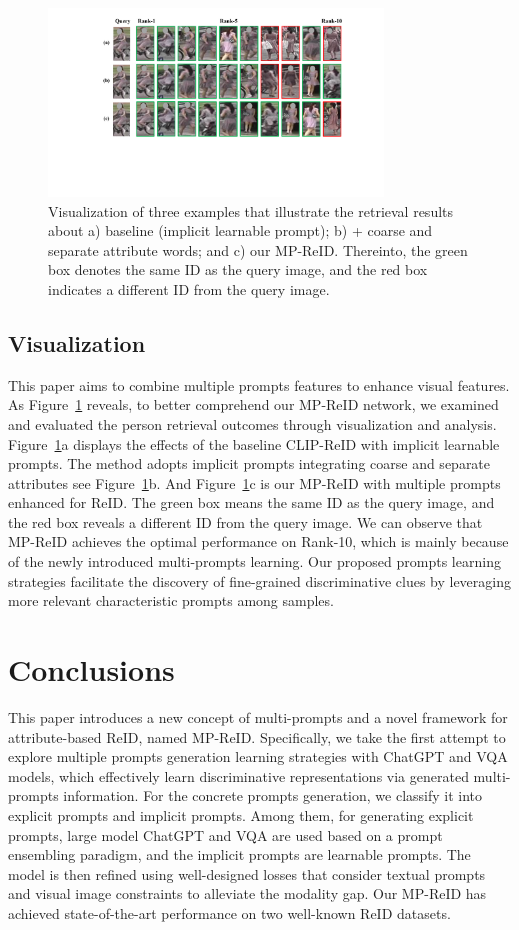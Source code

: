\documentclass[letterpaper]{article} %
\begin{document}
\begin{figure}[t!]
    \centering
    \includegraphics[width=1.0\linewidth,height=5.0cm]{results.pdf}
    \caption{Visualization of three examples that illustrate the retrieval results about a) baseline (implicit learnable prompt); b) + coarse and separate attribute words; and c) our MP-ReID. Thereinto, the green box denotes the same ID as the query image, and the red box indicates a different ID from the query image.}
    \label{visual3}
\end{figure}

\subsection{Visualization} \label{visualizations}
This paper aims to combine multiple prompts features to enhance visual features. As Figure~\ref{visual3} reveals, to better comprehend our MP-ReID network, we examined and evaluated the person retrieval outcomes through visualization and analysis. Figure~\ref{visual3}a displays the effects of the baseline CLIP-ReID with implicit learnable prompts. The method adopts implicit prompts integrating coarse and separate attributes see Figure~\ref{visual3}b. And Figure~\ref{visual3}c is our MP-ReID with multiple prompts enhanced for ReID. The green box means the same ID as the query image, and the red box reveals a different ID from the query image. We can observe that MP-ReID achieves the optimal performance on Rank-10, which is mainly because of the newly introduced multi-prompts learning. Our proposed prompts learning strategies facilitate the discovery of fine-grained discriminative clues by leveraging more relevant characteristic prompts among samples.

\section{Conclusions}
This paper introduces a new concept of multi-prompts and a novel framework for attribute-based ReID, named MP-ReID. Specifically, we take the first attempt to explore multiple prompts generation learning strategies with ChatGPT and VQA models, which effectively learn discriminative representations via generated multi-prompts information. For the concrete prompts generation, we classify it into explicit prompts and implicit prompts. Among them, for generating explicit prompts, large model ChatGPT and VQA are used based on a prompt ensembling paradigm, and the implicit prompts are learnable prompts. The model is then refined using well-designed losses that consider textual prompts and visual image constraints to alleviate the modality gap. Our MP-ReID has achieved state-of-the-art performance on two well-known ReID datasets.
\end{document}
